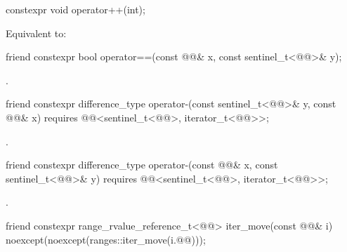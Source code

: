 %
\begin{itemdecl}
constexpr void operator++(int);
\end{itemdecl}

\begin{itemdescr}
\pnum
\effects
Equivalent to: 
\end{itemdescr}

%
\begin{itemdecl}
friend constexpr bool operator==(const @@& x, const sentinel_t<@@>& y);
\end{itemdecl}

\begin{itemdescr}
\pnum
\returns
{}.
\end{itemdescr}

%
\begin{itemdecl}
friend constexpr difference_type operator-(const sentinel_t<@@>& y, const @@& x)
  requires @@<sentinel_t<@@>, iterator_t<@@>>;
\end{itemdecl}

\begin{itemdescr}
\pnum
\returns
{}.
\end{itemdescr}

%
\begin{itemdecl}
friend constexpr difference_type operator-(const @@& x, const sentinel_t<@@>& y)
  requires @@<sentinel_t<@@>, iterator_t<@@>>;
\end{itemdecl}

\begin{itemdescr}
\pnum
\returns
{}.
\end{itemdescr}

%
\begin{itemdecl}
friend constexpr range_rvalue_reference_t<@@> iter_move(const @@& i)
  noexcept(noexcept(ranges::iter_move(i.@@)));
\end{itemdecl}

